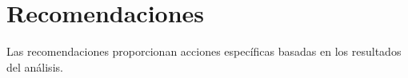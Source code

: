 \section{Recomendaciones}

Las recomendaciones proporcionan acciones específicas basadas en los resultados del análisis.